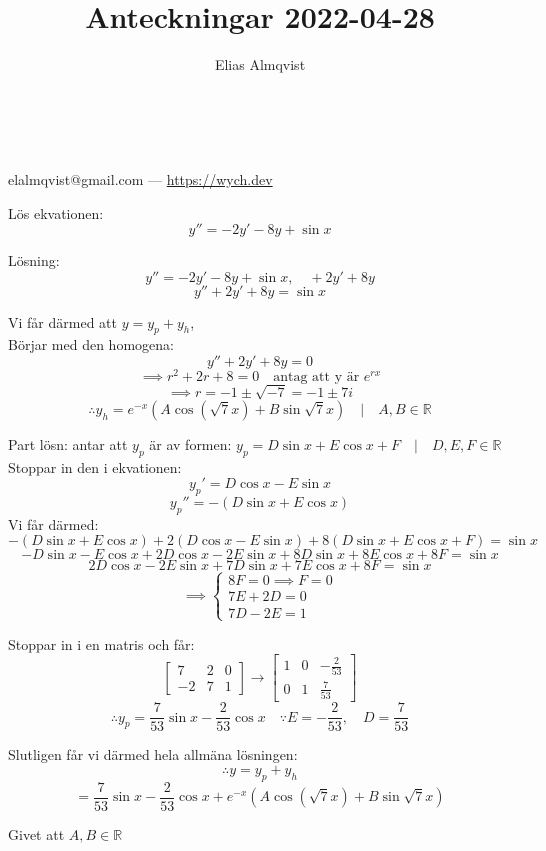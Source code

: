 \documentclass{article}
\makeatletter
\renewcommand{\maketitle}{
	\begin{center}
		{\huge\bfseries\thetitle}\\
		\vspace{1em}
		{\Large\theauthor} \\
		\vspace{1em}
		elalmqvist@gmail.com --- \url{https://wych.dev}
	\end{center}
}
\makeatother
\begin{document}
\title{Anteckningar 2022-04-28}
\author{Elias Almqvist}

\maketitle
\newpage

Lös ekvationen:
$$
y'' = -2y' - 8y + \sin x
$$

Lösning:
$$
y'' = -2y' - 8y + \sin x, \quad + 2y' + 8y
$$
$$
y'' + 2y' + 8y = \sin x
$$

Vi får därmed att $y = y_p + y_h$, \\
Börjar med den homogena:
$$
y'' + 2y' + 8y = 0
$$
$$
\implies r^2 + 2r + 8 = 0 \quad \text{antag att y är } e^{rx}
$$
$$
\implies r = -1 \pm \sqrt{-7} = -1 \pm 7i
$$
$$
\therefore y_h = e^{-x} \left( A\cos(\sqrt{7}x) + B\sin{\sqrt{7}x} \right) \quad | \quad A,B \in \mathbb{R}
$$

Part lösn: antar att $y_p$ är av formen: $y_p = D\sin x + E\cos x + F \quad | \quad D,E,F \in \mathbb{R}$ \\
Stoppar in den i ekvationen:
$$
y_p' = D\cos x - E\sin x 
$$
$$
y_p'' = -\left( D\sin x + E\cos x \right)
$$
Vi får därmed:
$$
-\left( D\sin x + E\cos x \right) + 2\left(D\cos x - E\sin x\right) + 8\left(D\sin x + E\cos x + F\right) = \sin x
$$
$$
-D\sin x - E\cos x + 2D\cos x - 2E\sin x + 8D\sin x + 8E\cos x + 8F = \sin x
$$
$$
2D\cos x - 2E\sin x + 7D\sin x + 7E\cos x + 8F = \sin x
$$
$$
\implies
\begin{cases}
	8F = 0 \implies F = 0 \\
	7E + 2D = 0 \\
	7D - 2E = 1
\end{cases}
$$

Stoppar in i en matris och får:
$$
\begin{bmatrix}
	7 & 2 & 0 \\
	-2 & 7 & 1
\end{bmatrix}
\rightarrow
\begin{bmatrix}
	1 & 0 & -\frac{2}{53} \\
	0 & 1 & \frac{7}{53}
\end{bmatrix}
$$
$$
\therefore y_p = \frac{7}{53} \sin x - \frac{2}{53} \cos x
\quad \because  E = -\frac{2}{53}, \quad D = \frac{7}{53}
$$

Slutligen får vi därmed hela allmäna lösningen:
$$
\therefore y = y_p + y_h 
$$
$$
= \frac{7}{53} \sin x - \frac{2}{53} \cos x + e^{-x} \left( A\cos(\sqrt{7}x) + B\sin{\sqrt{7}x} \right)
$$

Givet att $A,B \in \mathbb{R}$
\end{document}
